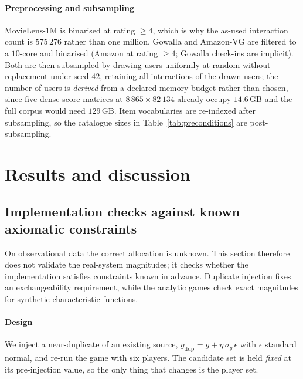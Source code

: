 \documentclass[pdflatex,sn-basic,Numbered]{sn-jnl}
\theoremstyle{plain}
\theoremstyle{definition}
\begin{document}
\paragraph{Preprocessing and subsampling}
MovieLens-1M is binarised at rating $\geq 4$, which is why the as-used
interaction count is $575\,276$ rather than one million. Gowalla and Amazon-VG
are filtered to a $10$-core and binarised (Amazon at rating $\geq 4$; Gowalla
check-ins are implicit). Both are then subsampled by drawing users uniformly at
random without replacement under seed $42$, retaining all interactions of the
drawn users; the number of users is \emph{derived} from a declared memory
budget rather than chosen, since five dense score matrices at
$8\,865 \times 82\,134$ already occupy $14.6$\,GB and the full corpus would
need $129$\,GB. Item vocabularies are re-indexed after subsampling, so the
catalogue sizes in Table~\ref{tab:preconditions} are post-subsampling.


\section{Results and discussion}\label{sec:results_discussion}

\subsection{Implementation checks against known axiomatic constraints}\label{sec:recovery}

On observational data the correct allocation is unknown. This section therefore
does not validate the real-system magnitudes; it checks whether the
implementation satisfies constraints known in advance. Duplicate injection
fixes an exchangeability requirement, while the analytic games check exact
magnitudes for synthetic characteristic functions.

\paragraph{Design}
We inject a near-duplicate of an existing source,
$g_{\text{dup}} = g + \eta\,\sigma_g\,\epsilon$ with $\epsilon$ standard
normal, and re-run the game with six players. The candidate set is held
\emph{fixed} at its pre-injection value, so the only thing that changes is the
player set.
\end{document}
